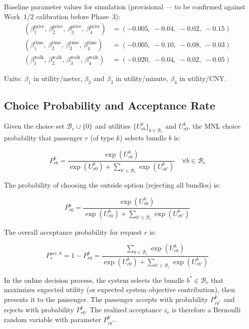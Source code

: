 Baseline parameter values for simulation (provisional --- to be confirmed against Work~1/2
calibration before Phase~3):
\begin{align}
  (\beta_1^{\text{price}},\, \beta_2^{\text{price}},\, \beta_3^{\text{price}},\, \beta_4^{\text{price}})
    &= (-0.005,\; -0.04,\; -0.02,\; -0.15) \label{eq:beta-price}\\
  (\beta_1^{\text{time}},\, \beta_2^{\text{time}},\, \beta_3^{\text{time}},\, \beta_4^{\text{time}})
    &= (-0.005,\; -0.10,\; -0.08,\; -0.03) \label{eq:beta-time}\\
  (\beta_1^{\text{walk}},\, \beta_2^{\text{walk}},\, \beta_3^{\text{walk}},\, \beta_4^{\text{walk}})
    &= (-0.020,\; -0.04,\; -0.02,\; -0.05) \label{eq:beta-walk}
\end{align}

Units: $\beta_1$ in utility/meter, $\beta_2$ and $\beta_3$ in utility/minute, $\beta_4$ in
utility/CNY.

\subsection*{Choice Probability and Acceptance Rate}

Given the choice set $\mathcal{B}_r \cup \{0\}$ and utilities $\{U_{rb}^k\}_{b \in \mathcal{B}_r}$
and $U_{r0}^k$, the MNL choice probability that passenger $r$ (of type $k$) selects bundle
$b$ is:

\begin{equation}\label{eq:choice-prob}
  P_{rb}^k = \frac{\exp(U_{rb}^k)}{\exp(U_{r0}^k) + \displaystyle\sum_{b' \in \mathcal{B}_r} \exp(U_{rb'}^k)}
  \quad \forall b \in \mathcal{B}_r
\end{equation}

The probability of choosing the outside option (rejecting all bundles) is:

\begin{equation}\label{eq:outside-prob}
  P_{r0}^k = \frac{\exp(U_{r0}^k)}{\exp(U_{r0}^k) + \displaystyle\sum_{b' \in \mathcal{B}_r} \exp(U_{rb'}^k)}
\end{equation}

The overall acceptance probability for request $r$ is:

\begin{equation}\label{eq:acceptance-prob}
  P_r^{\text{acc},k} = 1 - P_{r0}^k = \frac{\displaystyle\sum_{b \in \mathcal{B}_r} \exp(U_{rb}^k)}
  {\exp(U_{r0}^k) + \displaystyle\sum_{b' \in \mathcal{B}_r} \exp(U_{rb'}^k)}
\end{equation}

In the online decision process, the system selects the bundle $b^* \in \mathcal{B}_r$ that
maximizes expected utility (or expected system objective contribution), then presents it to
the passenger. The passenger accepts with probability $P_{rb^*}^k$ and rejects with
probability $P_{r0}^k$. The realized acceptance $z_r$ is therefore a Bernoulli random
variable with parameter $P_{rb^*}^k$.
